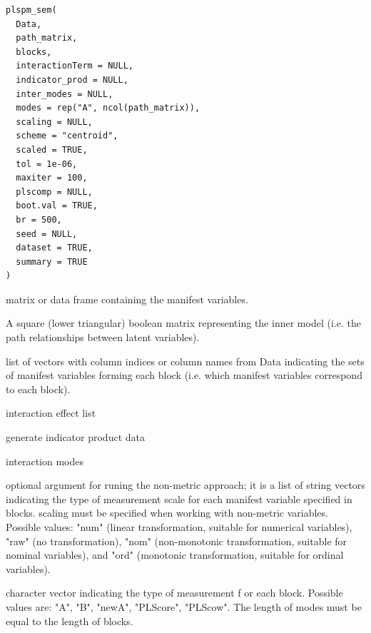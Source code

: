 \documentclass[a4paper]{book}
\begin{document}
%
\begin{Usage}
\begin{verbatim}
plspm_sem(
  Data,
  path_matrix,
  blocks,
  interactionTerm = NULL,
  indicator_prod = NULL,
  inter_modes = NULL,
  modes = rep("A", ncol(path_matrix)),
  scaling = NULL,
  scheme = "centroid",
  scaled = TRUE,
  tol = 1e-06,
  maxiter = 100,
  plscomp = NULL,
  boot.val = TRUE,
  br = 500,
  seed = NULL,
  dataset = TRUE,
  summary = TRUE
)
\end{verbatim}
\end{Usage}
%
\begin{Arguments}
\begin{ldescription}
\item[\code{Data}] matrix or data frame containing the manifest variables.

\item[\code{path\_matrix}] A square (lower triangular) boolean matrix
representing the inner model (i.e. the path relationships between latent variables).

\item[\code{blocks}] list of vectors with column indices
or column names from Data indicating the sets of
manifest variables forming each block (i.e.
which manifest variables correspond to each block).

\item[\code{interactionTerm}] interaction effect list

\item[\code{indicator\_prod}] generate indicator product data

\item[\code{inter\_modes}] interaction modes

\item[\code{modes}] optional argument for runing the non-metric approach;
it is a list of string vectors indicating the type of measurement
scale for each manifest variable specified in blocks. scaling must be
specified when working with non-metric variables. Possible values:
"num" (linear transformation, suitable for numerical variables),
"raw" (no transformation), "nom" (non-monotonic transformation,
suitable for nominal variables), and "ord" (monotonic transformation,
suitable for ordinal variables).

\item[\code{scaling}] character vector indicating the type of measurement f
or each block. Possible values are: "A", "B", "newA", "PLScore",
"PLScow". The length of modes must be equal to the length of blocks.


\end{ldescription}
\end{Arguments}
\end{document}
